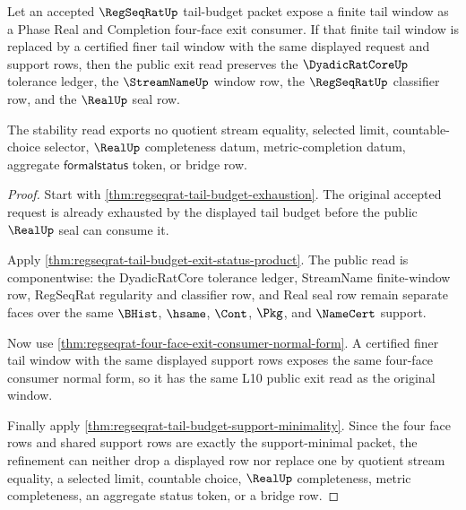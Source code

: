\begin{theorem}
\label{thm:regseqrat-tail-window-stability}
Let an accepted $\RegSeqRatUp$ tail-budget packet expose a finite tail window as a Phase Real and Completion four-face exit consumer. If that finite tail window is replaced by a certified finer tail window with the same displayed request and support rows, then the public exit read preserves the $\DyadicRatCoreUp$ tolerance ledger, the $\StreamNameUp$ window row, the $\RegSeqRatUp$ classifier row, and the $\RealUp$ seal row.

The stability read exports no quotient stream equality, selected limit, countable-choice selector, $\RealUp$ completeness datum, metric-completion datum, aggregate $\mathsf{formalstatus}$ token, or bridge row.
\end{theorem}
\begin{proof}
Start with \autoref{thm:regseqrat-tail-budget-exhaustion}. The original accepted request is already exhausted by the displayed tail budget before the public $\RealUp$ seal can consume it.

Apply \autoref{thm:regseqrat-tail-budget-exit-status-product}. The public read is componentwise: the DyadicRatCore tolerance ledger, StreamName finite-window row, RegSeqRat regularity and classifier row, and Real seal row remain separate faces over the same $\BHist$, $\hsame$, $\Cont$, $\Pkg$, and $\NameCert$ support.

Now use \autoref{thm:regseqrat-four-face-exit-consumer-normal-form}. A certified finer tail window with the same displayed support rows exposes the same four-face consumer normal form, so it has the same L10 public exit read as the original window.

Finally apply \autoref{thm:regseqrat-tail-budget-support-minimality}. Since the four face rows and shared support rows are exactly the support-minimal packet, the refinement can neither drop a displayed row nor replace one by quotient stream equality, a selected limit, countable choice, $\RealUp$ completeness, metric completeness, an aggregate status token, or a bridge row.
\end{proof}


